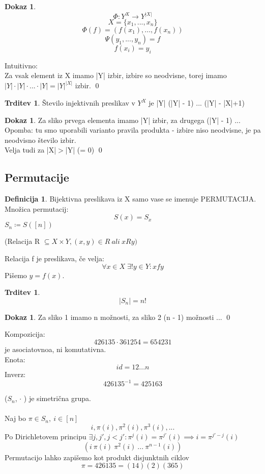 \documentclass[a4paper,12pt]{article}
\theoremstyle{definition}
\newtheorem{defn}[counter]{Definicija}
\newtheorem{claim}[counter]{Trditev}
\newtheorem{pro}[counter]{Dokaz}
\theoremstyle{remark}
\begin{document}
\begin{pro}
\[\Phi : Y^X \rightarrow Y^{|X|}\]
\[X = \{x_1, ..., x_n\}\]
\[\Phi (f) = (f(x_1), ..., f(x_n))\]
\[\Psi (y_1, ..., y_n) = f\]
\[f(x_i) = y_i\]

Intuitivno:\\
Za vsak element iz X imamo |Y| izbir, izbire so neodvisne, torej imamo $|Y|\cdot|Y|\cdot ... \cdot|Y| = |Y|^{|X|}$ izbir.
\qed
\end{pro}

\begin{claim}
Število injektivnih preslikav v $Y^X$ je |Y| (|Y| - 1) ... (|Y| - |X|+1)
\end{claim}

\begin{pro}
Za sliko prvega elementa imamo |Y| izbir, za drugega (|Y| - 1) ...\\
Opomba: tu smo uporabili varianto pravila produkta - izbire niso neodvisne, je pa neodvisno število izbir.\\
Velja tudi za |X|$ > $|Y| (= 0)
\qed
\end{pro}

\subsection{Permutacije}

\begin{defn}
Bijektivna preslikava iz X samo vase se imenuje PERMUTACIJA. Množica permutacij:
\[S(x) = S_x\]
$S_n \coloneqq S([n]) $
\end{defn}

(Relacija R $\subseteq X\times Y , (x,y)\in R \ ali \ xRy)$

Relacija f je preslikava, če velja:
\[\forall x \in X \; \exists! y \in Y: xfy\]
Pišemo $y=f(x).$

\begin{claim}
\[|S_n| = n!\]
\end{claim}
\begin{pro}
Za sliko 1 imamo n možnosti, za sliko 2 (n - 1) možnosti ...
\qed
\end{pro}


Kompozicija:
\[426135 \cdot 361254 = 654231\]
je asociatovnoa, ni komutativna.\\
Enota:
\[id = 12...n\]
Inverz:
\[426135^{-1} = 425163\]

($S_n$, $\cdot$ ) je simetrična grupa.\\
 \\
Naj bo $\pi \in S_n, \ i \in [n]$
\[i, \pi (i), \pi^2(i), \pi^3(i), ...\]
Po Dirichletovem principu $\exists j, j', j < j': \pi^j(i) = \pi^{j'}(i) \implies i = \pi^{j'-j}(i)$
\[(i \ \pi(i) \ \pi^2(i) \ ... \ \pi^{n - 1}(i))\]
Permutacijo lahko zapišemo kot produkt disjunktnih ciklov
\[\pi = 426135 = (1 4)(2)(3 6 5)\]
\end{document}
